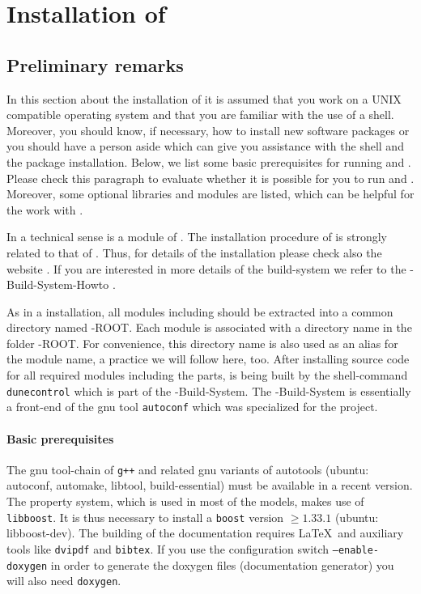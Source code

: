 \section{Installation of \Dumux} \label{install}
\subsection{Preliminary remarks}

In this section about the installation of \Dumux it is assumed that you work on a UNIX compatible operating system and that you are familiar with the use of a shell. 
Moreover, you should know,  if necessary, how to install new software packages or you should have a person aside which can give you assistance with the shell and the package installation. 
Below, we list some basic prerequisites for running \Dune and \Dumux. 
Please check this paragraph to evaluate whether it is possible for you to run \Dune and \Dumux. 
Moreover, some optional libraries and modules are listed, which can be helpful for the work with \Dumux. 

In a technical sense \Dumux is a module of \Dune. 
The installation procedure of \Dumux is strongly related to that of \Dune. 
Thus, for details of the installation please check also the {\Dune} website \cite{DUNE-HP}. 
If you are interested in more details of the build-system we refer to the {\Dune}-Build-System-Howto \cite{DUNE-HP}.

As in a \Dune installation, all \Dune modules including \Dumux should be extracted into a common directory named {\Dune}-ROOT.
Each \Dune module is associated with a directory name in the folder {\Dune}-ROOT. For convenience, this directory name is  also used as an alias for the module name, a practice we will follow here, too. After installing source code for all required \Dune modules including the \Dumux parts, \Dune is being built by the shell-command \texttt{dunecontrol} which is part of the {\Dune}-Build-System. The {\Dune}-Build-System is essentially a front-end of the gnu tool \texttt{autoconf} which was specialized for the \Dune project.

\paragraph{Basic prerequisites} \label{prerequisites}
The gnu tool-chain of \texttt{g++}  and related gnu variants of autotools (ubuntu: autoconf, automake, libtool, build-essential) must be available in a recent version. 
The \Dumux property system, which is used in most of the models, makes use of \texttt{libboost}. 
It is thus necessary to install a  \texttt{boost}  version $\geqslant 1.33.1$ (ubuntu: libboost-dev). 
The building of the documentation requires \LaTeX\ and auxiliary tools like \texttt{dvipdf} and \texttt{bibtex}. 
If you use the configuration switch \texttt{--enable-doxygen} in order to generate the doxygen files (documentation generator) you will also need \texttt{doxygen}.

